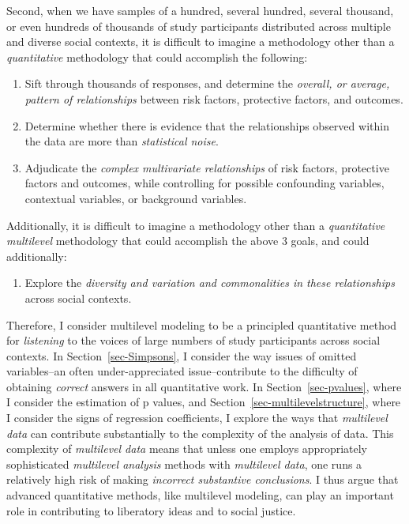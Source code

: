 \documentclass[
  letterpaper,
  DIV=11,
  numbers=noendperiod]{scrreprt}
\providecommand{\tightlist}{%
  \setlength{\itemsep}{0pt}\setlength{\parskip}{0pt}}\usepackage{longtable,booktabs,array}
\begin{document}
Second, when we have samples of a hundred, several hundred, several
thousand, or even hundreds of thousands of study participants
distributed across multiple and diverse social contexts, it is difficult
to imagine a methodology other than a \emph{quantitative} methodology
that could accomplish the following:

\begin{enumerate}
\def\labelenumi{\arabic{enumi}.}
\tightlist
\item
  Sift through thousands of responses, and determine the \emph{overall,
  or average, pattern of relationships} between risk factors, protective
  factors, and outcomes.
\item
  Determine whether there is evidence that the relationships observed
  within the data are more than \emph{statistical noise}.
\item
  Adjudicate the \emph{complex multivariate relationships} of risk
  factors, protective factors and outcomes, while controlling for
  possible confounding variables, contextual variables, or background
  variables.
\end{enumerate}

Additionally, it is difficult to imagine a methodology other than a
\emph{quantitative multilevel} methodology that could accomplish the
above 3 goals, and could additionally:

\begin{enumerate}
\def\labelenumi{\arabic{enumi}.}
\setcounter{enumi}{3}
\tightlist
\item
  Explore the \emph{diversity and variation and commonalities in these
  relationships} across social contexts. 
\end{enumerate}

Therefore, I consider multilevel modeling to be a principled
quantitative method for \emph{listening} to the voices of large numbers
of study participants across social contexts. In
Section~\ref{sec-Simpsons}, I consider the way issues of omitted
variables--an often under-appreciated issue--contribute to the
difficulty of obtaining \emph{correct} answers in all quantitative work.
In Section~\ref{sec-pvalues}, where I consider the estimation of p
values, and Section~\ref{sec-multilevelstructure}, where I consider the
signs of regression coefficients, I explore the ways that
\emph{multilevel data} can contribute substantially to the complexity of
the analysis of data. This complexity of \emph{multilevel data} means
that unless one employs appropriately sophisticated \emph{multilevel
analysis} methods with \emph{multilevel data}, one runs a relatively
high risk of making \emph{incorrect substantive conclusions}. I thus
argue that advanced quantitative methods, like multilevel modeling, can
play an important role in contributing to liberatory ideas and to social
justice.
\end{document}
